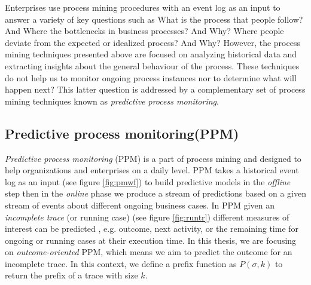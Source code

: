 Enterprises use process mining procedures with an event log as an input to answer a variety of key questions such as What is the process that people follow? And Where the bottlenecks in business processes? And Why? Where people deviate from the expected or idealized process? And Why? However, the process mining techniques presented above are focused on analyzing historical data and extracting insights about the general behaviour of the process. These techniques do not help us to monitor ongoing process instances nor to determine what will happen next? This latter question is addressed by a complementary set of process mining techniques known as \emph{predictive process monitoring}.


\subsection{Predictive process monitoring(PPM)}
\textit{Predictive process monitoring} (PPM) is a part of process mining and designed to help organizations and enterprises on a daily level. PPM takes a historical event log as an input (see figure \ref{fig:pmwf}) to build predictive models in the \textit{offline} step then in the \textit{online} phase we produce a stream of predictions based on a given stream of events about different ongoing business cases. In PPM given an \textit{incomplete trace} (or running case) (see figure \ref{fig:runtr}) different measures of interest can be predicted \cite{senderovich2019knowledge}, e.g. outcome,  next activity, or the remaining time for ongoing or running cases at their execution time. In this thesis, we are focusing on \textit{outcome-oriented} PPM, which means we aim to predict the outcome for an incomplete trace. In this context, we define a prefix function as $P(\sigma, k)$ to return the prefix of a trace with size $k$.


